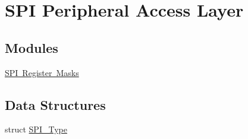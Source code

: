 \hypertarget{group___s_p_i___peripheral___access___layer}{}\section{S\+PI Peripheral Access Layer}
\label{group___s_p_i___peripheral___access___layer}
\subsection*{Modules}
\begin{DoxyCompactItemize}
\item 
\mbox{\hyperlink{group___s_p_i___register___masks}{S\+P\+I Register Masks}}
\end{DoxyCompactItemize}
\subsection*{Data Structures}
\begin{DoxyCompactItemize}
\item 
struct \mbox{\hyperlink{struct_s_p_i___type}{S\+P\+I\+\_\+\+Type}}
\end{DoxyCompactItemize}
